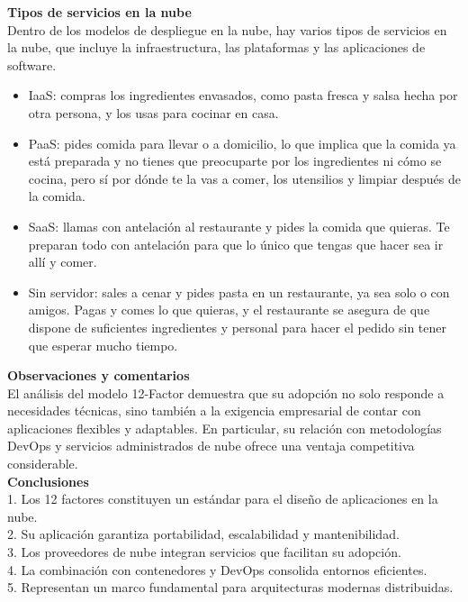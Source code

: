 \documentclass[12pt,letterpaper]{article}
\begin{document}
\textbf{Tipos de servicios en la nube}  \\
Dentro de los modelos de despliegue en la nube, hay varios tipos de servicios en la nube, que incluye la infraestructura, las plataformas y las aplicaciones de software. \\
\begin{itemize}
    \item IaaS: compras los ingredientes envasados, como pasta fresca y salsa hecha por otra persona, y los usas para cocinar en casa.
\end{itemize}
\begin{itemize}
    \item PaaS: pides comida para llevar o a domicilio, lo que implica que la comida ya está preparada y no tienes que preocuparte por los ingredientes ni cómo se cocina, pero sí por dónde te la vas a comer, los utensilios y limpiar después de la comida.
\end{itemize}
\begin{itemize}
    \item SaaS: llamas con antelación al restaurante y pides la comida que quieras. Te preparan todo con antelación para que lo único que tengas que hacer sea ir allí y comer.
\end{itemize}
\begin{itemize}
    \item Sin servidor: sales a cenar y pides pasta en un restaurante, ya sea solo o con amigos. Pagas y comes lo que quieras, y el restaurante se asegura de que dispone de suficientes ingredientes y personal para hacer el pedido sin tener que esperar mucho tiempo.
\end{itemize}


\textbf{Observaciones y comentarios}  \\
El análisis del modelo 12-Factor demuestra que su adopción no solo responde a necesidades técnicas, sino también a la exigencia empresarial de contar con aplicaciones flexibles y adaptables. En particular, su relación con metodologías DevOps y servicios administrados de nube ofrece una ventaja competitiva considerable.  \\

\textbf{Conclusiones}  \\
1. Los 12 factores constituyen un estándar para el diseño de aplicaciones en la nube. \\ 
2. Su aplicación garantiza portabilidad, escalabilidad y mantenibilidad.  \\
3. Los proveedores de nube integran servicios que facilitan su adopción.  \\
4. La combinación con contenedores y DevOps consolida entornos eficientes.  \\
5. Representan un marco fundamental para arquitecturas modernas distribuidas.  \\
\end{document}
